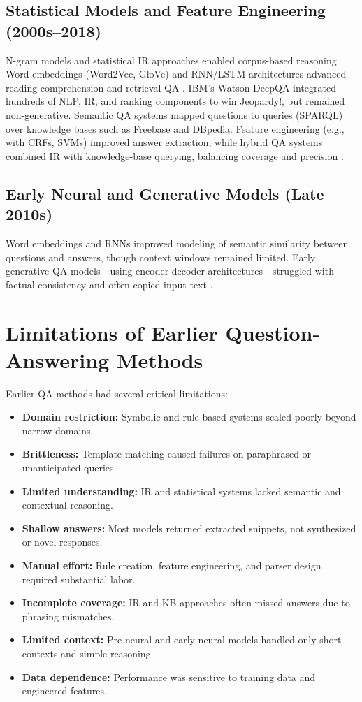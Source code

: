 \begin{spacing}{1.5}
\subsection{Statistical Models and Feature Engineering (2000s–2018)}
N-gram models and statistical IR approaches enabled corpus-based reasoning. Word embeddings (Word2Vec, GloVe) and RNN/LSTM architectures advanced reading comprehension and retrieval QA \citep{jurafsky_chapter_2024}. IBM's Watson DeepQA \citep{noauthor_ibm_2025} integrated hundreds of NLP, IR, and ranking components to win Jeopardy!, but remained non-generative.  Semantic QA systems \citep{franco_ontology-based_2020} mapped questions to queries (SPARQL) over knowledge bases such as Freebase and DBpedia. Feature engineering (e.g., with CRFs, SVMs) improved answer extraction, while hybrid QA systems combined IR with knowledge-base querying, balancing coverage and precision \citep{antoniou_survey_2022}.

\subsection{Early Neural and Generative Models (Late 2010s)}
Word embeddings and RNNs improved modeling of semantic similarity between questions and answers, though context windows remained limited. Early generative QA models—using encoder-decoder architectures—struggled with factual consistency and often copied input text \citep{caballero_brief_2021}.

\section{Limitations of Earlier Question-Answering Methods}

Earlier QA methods had several critical limitations:
\begin{itemize}
    \item \textbf{Domain restriction:} Symbolic and rule-based systems scaled poorly beyond narrow domains.
    \item \textbf{Brittleness:} Template matching caused failures on paraphrased or unanticipated queries.
    \item \textbf{Limited understanding:} IR and statistical systems lacked semantic and contextual reasoning.
    \item \textbf{Shallow answers:} Most models returned extracted snippets, not synthesized or novel responses.
    \item \textbf{Manual effort:} Rule creation, feature engineering, and parser design required substantial labor.
    \item \textbf{Incomplete coverage:} IR and KB approaches often missed answers due to phrasing mismatches.
    \item \textbf{Limited context:} Pre-neural and early neural models handled only short contexts and simple reasoning.
    \item \textbf{Data dependence:} Performance was sensitive to training data and engineered features.
\end{itemize}
\citep{farea_understanding_2025, alanazi_question_2021, alqifari_question_2019, diefenbach_core_2018, hirschman_natural_2001}


\end{spacing}
